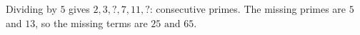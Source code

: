 Dividing by $5$ gives $2,3,?,7,11,?$: consecutive primes. The missing primes are $5$ and $13$, so the missing terms are $\boxed{25\text{ and }65}$.
